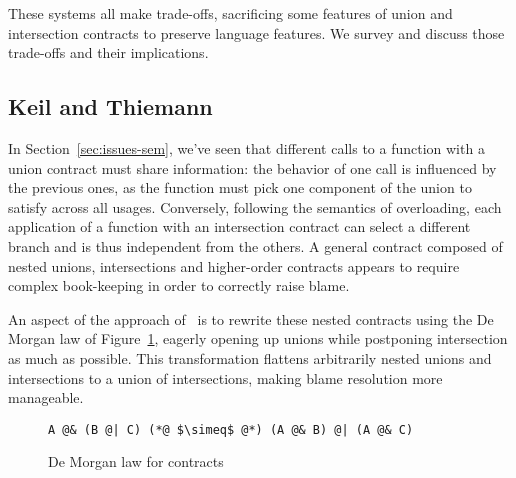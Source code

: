\documentclass[sigplan,10pt,review,anonymous]{acmart}
\newcommand{\unsure}[2][1=]{}
\begin{document}
These systems all make trade-offs, sacrificing some features of union
and intersection contracts to preserve language features. We survey
and discuss those trade-offs and their implications.

\subsection{Keil and Thiemann}
\label{sec:keil-thiemann}
\unsure{Subsection title?}

In Section~\ref{sec:issues-sem}, we've seen that different calls to a function
with a union contract must share information: the behavior of one call is
influenced by the previous ones, as the function must pick one component of the
union to satisfy across all usages. Conversely, following the semantics of
overloading, each application of a function with an intersection contract can
select a different branch and is thus independent from the others. A general
contract composed of nested unions, intersections and higher-order contracts
appears to require complex book-keeping in order to correctly raise blame.

An aspect of the approach of~\cite{KeilThiemannUnionIntersection} is to rewrite
these nested contracts using the De Morgan law of
Figure~\ref{fig:de-morgan-law}, eagerly opening up unions while postponing
intersection as much as possible.   This transformation flattens arbitrarily nested unions and
intersections to a union of intersections, making blame resolution more
manageable.\unsure{(Yann) find better (more precise) wording}

\begin{figure}[h]
\begin{lstlisting}[frame=none, numbers=none, language=nickel]
A @& (B @| C) (*@ $\simeq$ @*) (A @& B) @| (A @& C)
\end{lstlisting}
\caption{De Morgan law for contracts}
\label{fig:de-morgan-law}
\end{figure}
\end{document}

